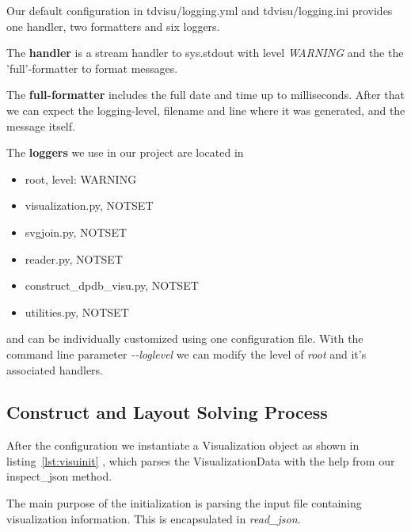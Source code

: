 \documentclass[a4paper, 12pt]{scrartcl}
\begin{document}
Our default configuration in tdvisu/logging.yml and tdvisu/logging.ini provides one handler, two formatters and six loggers.

The \textbf{handler} is a stream handler to sys.stdout with level \textit{WARNING} and the the 'full'-formatter to format messages.

The \textbf{full-formatter} includes the full date and time up to milliseconds. After that we can expect the logging-level, filename and line where it was generated, and the message itself.

The \textbf{loggers} we use in our project are located in 
\begin{itemize}
	\item root, level: WARNING
	\item visualization.py, NOTSET
	\item svgjoin.py, NOTSET
    \item reader.py, NOTSET
	\item construct\_dpdb\_visu.py, NOTSET
	\item utilities.py, NOTSET
\end{itemize}
and can be individually customized using one configuration file.
With the command line parameter \textit{-{}-loglevel} we can modify the level of \textit{root} and it's associated handlers.

\subsection{Construct and Layout Solving Process}

After the configuration we instantiate a Visualization object as shown in listing~\ref{lst:visuinit} , which parses the VisualizationData with the help from our inspect\_json method. 

The main purpose of the initialization is parsing the input file containing visualization information.
This is encapsulated in \textit{read\_json}.
\end{document}
